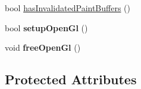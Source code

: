 \begin{DoxyCompactItemize}
\item 
bool \hyperlink{classQCustomPlot_ad452b582348c8e99462d83fe1cd0279b}{has\+Invalidated\+Paint\+Buffers} ()
\item 
bool {\bfseries setup\+Open\+Gl} ()\hypertarget{classQCustomPlot_a8954c4667c51070ff4e9b02d858fd190}{}\label{classQCustomPlot_a8954c4667c51070ff4e9b02d858fd190}

\item 
void {\bfseries free\+Open\+Gl} ()\hypertarget{classQCustomPlot_aaa3073362074581a7b5905726b4a0067}{}\label{classQCustomPlot_aaa3073362074581a7b5905726b4a0067}

\end{DoxyCompactItemize}
\subsection*{Protected Attributes}
